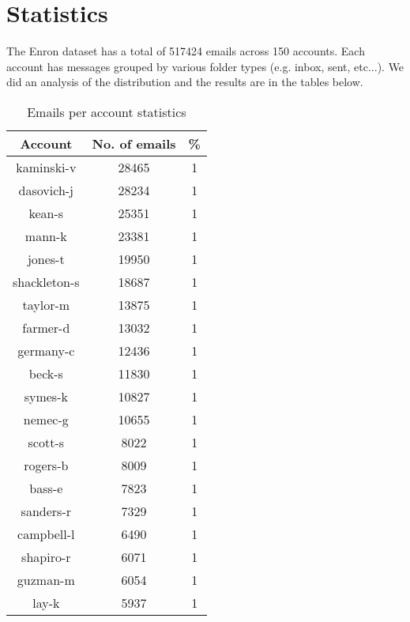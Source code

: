 \documentclass[senior,oneside]{UIUC}
\begin{document}
\section{Statistics}

The Enron dataset has  a total of 517424 emails across 150 accounts. Each account has messages grouped by various folder types (e.g. inbox, sent, etc...). We did an analysis of the distribution and the results are in the tables below.

\begin{table}[ht]
\caption{Emails per account statistics}
\centering
\begin{tabular}{c c c }
\hline \hline
Account & No. of emails & \% \\ [0.5ex]
\hline
kaminski-v & 28465 & 1 \\
dasovich-j & 28234 & 1 \\
kean-s & 25351 & 1 \\
mann-k & 23381 & 1 \\
jones-t & 19950 & 1 \\
shackleton-s & 18687 & 1 \\
taylor-m & 13875 & 1 \\
farmer-d & 13032 & 1 \\
germany-c & 12436 & 1 \\
beck-s & 11830 & 1 \\
symes-k & 10827 & 1 \\
nemec-g & 10655 & 1 \\
scott-s & 8022 & 1 \\
rogers-b & 8009 & 1 \\
bass-e & 7823 & 1 \\
sanders-r & 7329 & 1 \\
campbell-l & 6490 & 1 \\
shapiro-r & 6071 & 1 \\
guzman-m & 6054 & 1 \\
lay-k & 5937 & 1 \\
\hline
\end{tabular}
\end{table}
\end{document}
